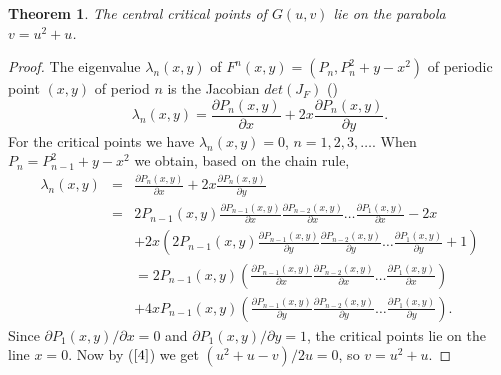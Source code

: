 \documentclass[12pt,a4paper]{amsart}
\newtheorem{lause}{Theorem}
\numberwithin{equation}{section}
\numberwithin{lause}{section}
\begin{document}
\begin{lause} \label{lause1.1.1}
The central critical points of $G(u,v)$ lie on the parabola
$v=u^2+u$.
\end{lause}
\begin{proof}
The eigenvalue $\lambda_{n}(x,y)$ of $F^{n}(x,y)=(P_{n}, P_{n}^{2}+y-x^{2})$ of periodic point $(x,y)$ of period $n$ is the Jacobian $det(J_{F})$ (\cite{1})
\begin{equation}
\lambda_{n}(x,y)=\frac{\partial P_{n}(x,y)}{\partial
x}+2x\frac{\partial P_{n}(x,y)}{\partial y}. \label{3.1}
\end{equation}
For the critical points we have $\lambda_{n}(x,y)=0$, $n=1,2,3,\ldots$.
 When $P_{n}=P_{n-1}^{2}+y-x^{2}$ we obtain, based on the chain rule,
 \begin{eqnarray*}
\lambda_{n}(x,y)&=&\frac{\partial P_{n}(x,y)}{\partial x}+2x\frac{\partial P_{n}(x,y)}{\partial y}\\
&=&2P_{n-1}(x,y)\frac{\partial P_{n-1}(x,y)}{\partial x}\frac{\partial P_{n-2}(x,y)}{\partial x} \ldots \frac{\partial P_{1}(x,y)}{\partial x}-2x \\
&&+2x\left(2P_{n-1}(x,y)\frac{\partial P_{n-1}(x,y)}{\partial y}\frac{\partial P_{n-2}(x,y)}{\partial y} \ldots   \frac{\partial P_{1}(x,y)}{\partial y}+1\right)\\
&&=2P_{n-1}(x,y)\left(\frac{\partial P_{n-1}(x,y)}{\partial x}\frac{\partial P_{n-2}(x,y)}{\partial x} \ldots \frac{\partial P_{1}(x,y)}{\partial x}\right)\\
&&+4xP_{n-1}(x,y)\left(\frac{\partial P_{n-1}(x,y)}{\partial y}\frac{\partial P_{n-2}(x,y)}{\partial y} \ldots   \frac{\partial P_{1}(x,y)}{\partial y}\right).
\end{eqnarray*}
Since $\partial P_{1}(x,y)/\partial x=0$ and $\partial
P_{1}(x,y)/\partial y=1$,
the critical points lie on the line $x=0$. Now by ($\ref{4}$) we get $(u^{2}+u-v)/2u=0$, so
$v=u^2+u$.
\end{proof}
\end{document}
